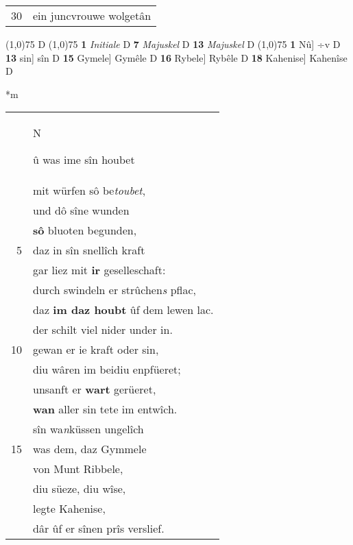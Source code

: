 \documentclass[8pt,a4paper,notitlepage]{article}
\begin{document}
\begin{table}[ht]
\begin{minipage}[t]{0.5\linewidth}
\begin{tabular}{rl}
30 & ein juncvrouwe wolgetân\\ 
\end{tabular}
\scriptsize
\line(1,0){75} \newline
D \newline
\line(1,0){75} \newline
\textbf{1} \textit{Initiale} D  \textbf{7} \textit{Majuskel} D  \textbf{13} \textit{Majuskel} D  \newline
\line(1,0){75} \newline
\textbf{1} Nû] ÷v D \textbf{13} sin] sîn D \textbf{15} Gymele] Gymêle D \textbf{16} Rybele] Rybêle D \textbf{18} Kahenise] Kahenîse D \newline
\end{minipage}
\hspace{0.5cm}
\begin{minipage}[t]{0.5\linewidth}
\small
\begin{center}*m
\end{center}
\begin{tabular}{rl}
 & \begin{large}N\end{large}û was ime sîn houbet\\ 
 & mit würfen sô be\textit{toubet},\\ 
 & und dô sîne wunden\\ 
 & \textbf{sô} bluoten begunden,\\ 
5 & daz in sîn snellîch kraft\\ 
 & gar liez mit \textbf{ir} geselleschaft:\\ 
 & durch swindeln er strûchen\textit{s} pflac,\\ 
 & daz \textbf{im daz houbt} ûf dem lewen lac.\\ 
 & der schilt viel nider under in.\\ 
10 & gewan er ie kraft oder sin,\\ 
 & diu wâren im beidiu enpfüeret;\\ 
 & unsanft er \textbf{wart} gerüeret,\\ 
 & \textbf{wan} aller sin tete im entwîch.\\ 
 & sîn wa\textit{n}küssen ungelîch\\ 
15 & was dem, daz Gymmele\\ 
 & von Munt Ribbele,\\ 
 & diu süeze, diu wîse,\\ 
 & legte Kahenise,\\ 
 & dâr ûf er sînen prîs verslief.\\ 

\end{tabular}
\end{minipage}
\end{table}
\end{document}
